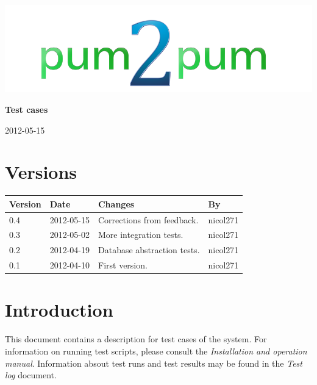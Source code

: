 \documentclass[a4paper, 12pt, titlepage]{article}
\begin{document}
	
	\begin{titlepage}
		
		\includegraphics[scale=0.4]{logoNormal.png}
		
		\vspace{6cm}
		
		\begin{center}
			\Huge{\textbf{Test cases}} %
			
			\vspace{0.5cm}
			
			\huge{2012-05-15} %
		\end{center}
		
	\end{titlepage}
	
	\tableofcontents
	\newpage
	
	\section*{Versions}
	\begin{tabularx}{1\textwidth}{|l|l|X|l|}
		\hline
		\bf{Version} & \bf{Date} & \bf{Changes} & \bf{By} \\
		\hline
		0.4 & 2012-05-15 & Corrections from feedback. & nicol271 \\
		\hline
		0.3 & 2012-05-02 & More integration tests. & nicol271 \\
		\hline
		0.2 & 2012-04-19 & Database abstraction tests. & nicol271 \\
		\hline
		0.1 & 2012-04-10 & First version. & nicol271 \\
		\hline
	\end{tabularx}
	\newpage
	
	\section*{Introduction}
	This document contains a description for test cases of the system. For information on running test scripts, please consult the \emph{Installation and operation manual}. Information absout test runs and test results may be found in the \emph{Test log} document.
\end{document}
